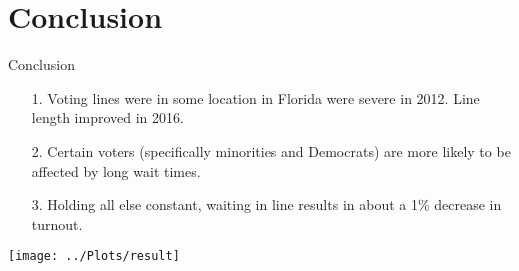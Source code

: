 \documentclass{beamer}
\begin{document}
		\section{Conclusion}
	
		\begin{frame}
			Conclusion
			\begin{itemize}
				\item[1.] Voting lines were in some location in Florida were severe in 2012.  Line length improved in 2016.
				\item[2.] Certain voters (specifically minorities and Democrats) are more likely to be affected by long wait times. 
				\item[3.] Holding all else constant, waiting in line results in about a 1\% decrease in turnout.
			\end{itemize}
		\end{frame}
		
		\begin{frame}
		\centering
			\texttt{[image: ../Plots/result]}
		\end{frame}
		
			
\end{document}
